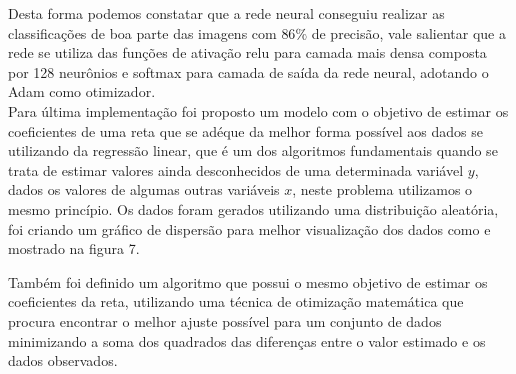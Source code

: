 \documentclass[12pt,openright,openany,oneside,article,a4paper,brazi]{abntex2}
\begin{document}
Desta forma podemos constatar que a rede neural conseguiu realizar as classificações de boa parte das imagens com $\displaystyle 86\%$ de precisão, vale salientar que a rede se utiliza das funções de ativação
relu para camada mais densa composta por 128 neurônios e softmax para camada de saída da rede neural, adotando o Adam como otimizador. \\

Para última implementação foi proposto um modelo com o objetivo de estimar os coeficientes de uma reta que se adéque da melhor forma possível aos dados se utilizando da regressão linear, que é um dos algoritmos fundamentais quando se trata 
de estimar valores ainda desconhecidos de uma determinada variável $\displaystyle y$, dados os valores de algumas outras variáveis $\displaystyle x$, neste problema utilizamos o mesmo princípio. Os dados foram gerados utilizando uma distribuição
aleatória, foi criando um gráfico de dispersão para melhor visualização dos dados como e mostrado na figura 7.

Também foi definido um algoritmo que possui o mesmo objetivo de estimar os coeficientes da reta, utilizando uma técnica de otimização matemática que procura encontrar o 
melhor ajuste possível para um conjunto de dados minimizando a soma dos quadrados das diferenças entre o valor estimado e os dados observados. \\ \\
\end{document}
